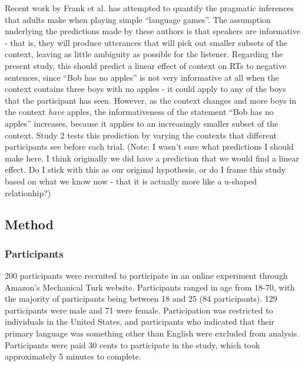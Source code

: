 \documentclass[10pt,letterpaper]{article}
\begin{document}
Recent work by Frank et al. \cite{frank2009, frank2012} has attempted to quantify the pragmatic inferences that adults make when playing simple ``language games''. The assumption underlying the predictions made by these authors is that speakers are informative - that is, they will produce utterances that will pick out smaller subsets of the context, leaving as little ambiguity as possible for the listener.  Regarding the present study, this should predict a linear effect of context on RTs to negative sentences, since ``Bob has no apples'' is not very informative at all when the context contains three boys with no apples - it could apply to any of the boys that the participant has seen.  However, as the context changes and more boys in the context \emph{have} apples, the informativeness of the statement ``Bob has no apples'' increases, because it applies to an increasingly smaller subset of the context.  Study 2 tests this prediction by varying the contexts that different participants see before each trial.  (Note: I wasn't sure what predictions I should make here.  I think originally we did have a prediction that we would find a linear effect.  Do I stick with this as our original hypothesis, or do I frame this study based on what we know now - that it is actually more like a u-shaped relationhip?)



\subsection{Method}

\subsubsection{Participants}
200 participants were recruited to participate in an online experiment through Amazon's Mechanical Turk website.  Participants ranged in age from 18-70, with the majority of participants being between 18 and 25 (84 participants).  129 participants were male and 71 were female.  Participation was restricted to individuals in the United States, and participants who indicated that their primary language was something other than English were excluded from analysis.  Participants were paid 30 cents to participate in the study, which took approximately 5 minutes to complete.  
\end{document}
